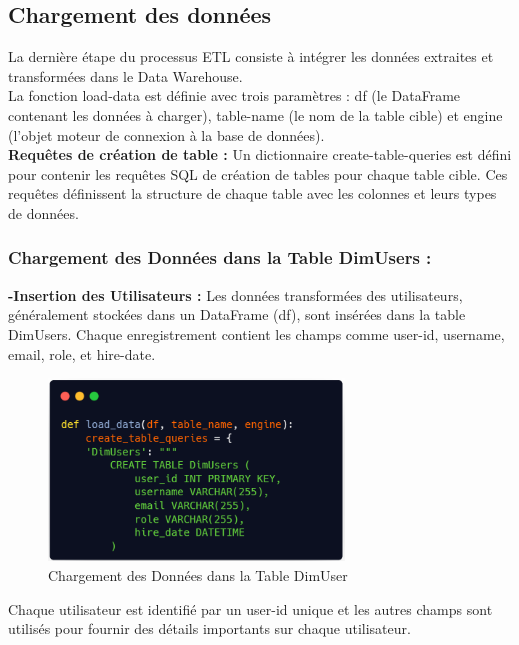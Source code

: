 \subsection{Chargement des données}
La dernière étape du processus ETL consiste à intégrer les données extraites et transformées dans le Data Warehouse.\\

\noindent
La fonction load-data est définie avec trois paramètres : df (le DataFrame contenant les données à charger), table-name (le nom de la table cible) et engine (l'objet moteur de connexion à la base de données).\\
\textbf{Requêtes de création de table :} Un dictionnaire create-table-queries est défini pour contenir les requêtes SQL de création de tables pour chaque table cible. Ces requêtes définissent la structure de chaque table avec les colonnes et leurs types de données.\\

\subsubsection{Chargement des Données dans la Table DimUsers :}
\noindent
\textbf{-Insertion des Utilisateurs :} Les données transformées des utilisateurs, généralement stockées dans un DataFrame (df), sont insérées dans la table DimUsers. Chaque enregistrement contient les champs comme user-id, username, email, role, et hire-date.
\bigskip
\begin{figure}[h!]

    \centering
    \includegraphics[width=0.7\textwidth]{chap6.images/load usee.png}
    \caption{ Chargement des Données dans la Table DimUser }

\end{figure}

Chaque utilisateur est identifié par un user-id unique et les autres champs sont utilisés pour fournir des détails importants sur chaque utilisateur.


